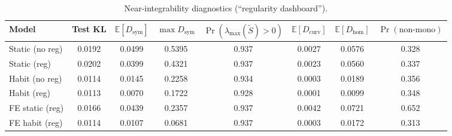 \begin{table}[t]
\centering
\caption{Near-integrability diagnostics (``regularity dashboard'').}
\label{tab:regularity_dashboard}
\begin{tabular}{lccccccc}
\toprule
Model & Test KL & $\mathbb E[D_{\mathrm{sym}}]$ & $\max D_{\mathrm{sym}}$ & $\Pr(\lambda_{\max}(\tilde S)>0)$ & $\mathbb E[D_{\mathrm{curv}}]$ & $\mathbb E[D_{\mathrm{hom}}]$ & $\Pr(\text{non-mono})$ \\
\midrule
Static (no reg) & 0.0192 & 0.0499 & 0.5395 & 0.937 & 0.0027 & 0.0576 & 0.328 \\
Static (reg) & 0.0202 & 0.0399 & 0.4321 & 0.937 & 0.0023 & 0.0560 & 0.337 \\
Habit (no reg) & 0.0114 & 0.0145 & 0.2258 & 0.934 & 0.0003 & 0.0189 & 0.356 \\
Habit (reg) & 0.0113 & 0.0070 & 0.1722 & 0.928 & 0.0001 & 0.0099 & 0.348 \\
\addlinespace
FE static (reg) & 0.0166 & 0.0439 & 0.2357 & 0.937 & 0.0042 & 0.0721 & 0.652 \\
FE habit (reg) & 0.0114 & 0.0107 & 0.0681 & 0.937 & 0.0003 & 0.0172 & 0.313 \\
\bottomrule
\end{tabular}
\end{table}
